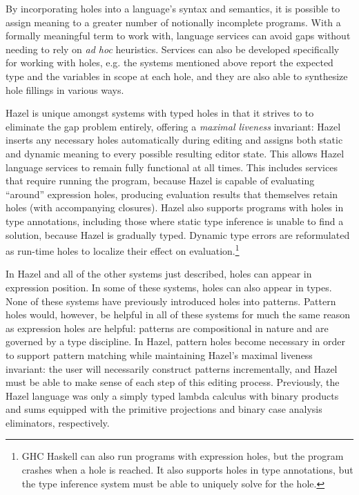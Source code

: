 By incorporating holes into a language's syntax and semantics, 
it is possible to assign meaning to a greater number of notionally incomplete programs.
With a formally meaningful term to work with, language services can avoid gaps without needing to rely on \emph{ad hoc} heuristics.
Services can also be developed specifically for working with holes, e.g. the systems mentioned above report  
the expected type and the variables in scope at each hole, and they are also able to synthesize hole fillings in various ways.

Hazel is unique amongst systems with typed holes in that it strives to to eliminate the gap problem entirely, offering a \emph{maximal liveness} invariant: Hazel inserts any necessary holes automatically during editing and assigns both static and dynamic meaning to every possible resulting 
editor state. This allows Hazel language services to remain fully functional at all
times. This includes services that require running the program, because Hazel is capable of evaluating ``around'' 
expression holes, producing evaluation results that themselves retain holes (with accompanying closures). Hazel also supports programs with holes in type annotations, including those where static type inference is unable to find a solution, because Hazel is gradually typed. Dynamic type errors are reformulated as run-time holes to localize their effect on evaluation.\footnote{GHC Haskell can also run programs with expression holes, but the program crashes when a hole is reached. It also supports holes in type annotations, but the type inference system must be able to uniquely solve for the hole.} 

In Hazel and all of the other systems just described, 
holes can appear in expression position.
In some of these systems, holes can also appear in types. 
None of these systems have previously introduced holes into patterns. 
Pattern holes would, however, be helpful in all of these systems for much the same reason as expression holes are helpful: patterns are compositional in nature and are governed by a type discipline. 
In Hazel, pattern holes become necessary in order to support pattern matching while maintaining Hazel's maximal liveness invariant: the user will necessarily construct patterns incrementally, and Hazel must be able to make sense of each step of this editing process.
Previously, the Hazel language was only a simply typed lambda calculus with binary products and sums equipped with the primitive projections and binary case analysis eliminators, respectively.

